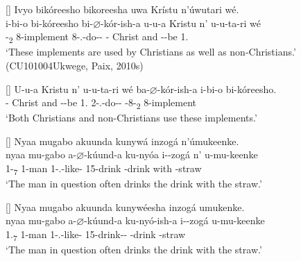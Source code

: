 \documentclass[output=paper]{langscibook}
\begin{document}
\ea
\label{ex:implements}\citep[120--122]{Nshemezimana2016}

\ea
\begin{xlist}[SVOOOOO]
[]{
\label{ex:implements:a}
Ivyo bikóreesho bikoreesha uwa Krístu n’úwutari wé.\\
\gll
i-bi-o  bi-kóreesho  bi-$\varnothing$-kór-ish-a u-u-a  Kristu  n’  u-u-ta-ri  wé\\
-\DEM{}\textsubscript{2}  8-implement  8\SM-\PRS.\CJ-{}do-\CAUS-\FV{}   -\CONN{}  Christ  and  -\NEG-{}be  1.\PRO{}\\
\glt
‘These implements are used by Christians as well as non-Christians.’ (CU101004Ukwege, Paix, 2010s)
}
\end{xlist}

\ex
\begin{xlist}[SVOOOOO]
[]{
\label{ex:implements:b}
\gll
U-u-a  Kristu  n’  u-u-ta-ri  wé   ba-$\varnothing$-kór-ish-a  i-bi-o  bi-kóreesho. \\
-\CONN{}  Christ  and  -\NEG-{}be  1.\PRO{}   2\SM-\PRS.\CJ-{}do-\CAUS{}-\FV{}  \AUG{}-8-\DEM{}\textsubscript{2}  8-implement \\
\glt
  ‘Both Christians and non-Christians use these implements.’
}
\end{xlist}
\z

\ex
\label{ex:drinkstraw}
\ea
\begin{xlist}[SVOOOOO]
[]{
\label{ex:drinkstraw:a}
Nyaa mugabo akuunda kunywá inzogá n’úmukeenke.\\
\gll
nyaa  mu-gabo  a-$\varnothing$-kúund-a  ku-nyóa  i-\N-{}zogá   n’  u-mu-keenke \\
1-\DEM{}\textsubscript{7}  1-man  1\SM-\PRS.\CJ-{}like-\FV{}  {}15-{}drink  -{}drink    with  -{}straw \\
\glt
  ‘The man in question often drinks the drink with the straw.’
}
\end{xlist}

\ex
\begin{xlist}[SVOOOOO]
[]{
\label{ex:drinkstraw:b}
Nyaa mugabo akuunda kunywéesha inzogá umukenke.\\
\gll
nyaa  mu-gabo  a-$\varnothing$-kúund-a  ku-nyó-ish-a  i-\N-{}zogá   u-mu-keenke \\
1.\DEM{}\textsubscript{7}  1-man  1\SM-\PRS.\CJ-{}like-\FV{}  {}15-{}drink-\CAUS{}-\FV{}  -{}drink   -{}straw \\
\glt
‘The man in question often drinks the drink with the straw.’\\
}
\end{xlist}
\end{document}
